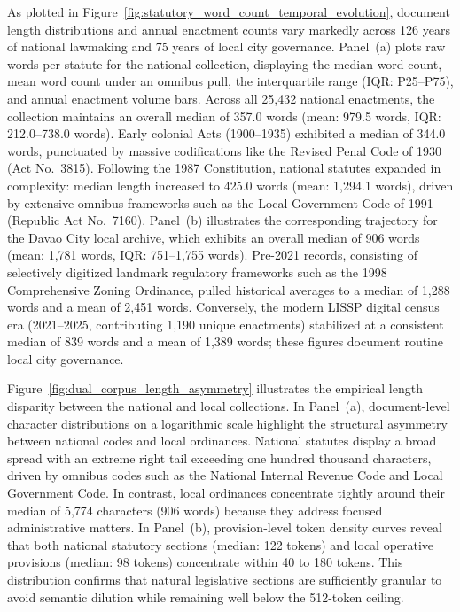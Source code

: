 As plotted in Figure~\ref{fig:statutory_word_count_temporal_evolution}, document length distributions and annual enactment counts vary markedly across 126 years of national lawmaking and 75 years of local city governance. Panel~(a) plots raw words per statute for the national collection, displaying the median word count, mean word count under an omnibus pull, the interquartile range (IQR: P25--P75), and annual enactment volume bars. Across all 25,432 national enactments, the collection maintains an overall median of 357.0 words (mean: 979.5 words, IQR: 212.0--738.0 words). Early colonial Acts (1900--1935) exhibited a median of 344.0 words, punctuated by massive codifications like the Revised Penal Code of 1930 (Act No.~3815). Following the 1987 Constitution, national statutes expanded in complexity: median length increased to 425.0 words (mean: 1,294.1 words), driven by extensive omnibus frameworks such as the Local Government Code of 1991 (Republic Act No.~7160). Panel~(b) illustrates the corresponding trajectory for the Davao City local archive, which exhibits an overall median of 906 words (mean: 1,781 words, IQR: 751--1,755 words). Pre-2021 records, consisting of selectively digitized landmark regulatory frameworks such as the 1998 Comprehensive Zoning Ordinance, pulled historical averages to a median of 1,288 words and a mean of 2,451 words. Conversely, the modern LISSP digital census era (2021--2025, contributing 1,190 unique enactments) stabilized at a consistent median of 839 words and a mean of 1,389 words; these figures document routine local city governance.

Figure~\ref{fig:dual_corpus_length_asymmetry} illustrates the empirical length disparity between the national and local collections. In Panel~(a), document-level character distributions on a logarithmic scale highlight the structural asymmetry between national codes and local ordinances. National statutes display a broad spread with an extreme right tail exceeding one hundred thousand characters, driven by omnibus codes such as the National Internal Revenue Code and Local Government Code. In contrast, local ordinances concentrate tightly around their median of 5,774 characters (906 words) because they address focused administrative matters. In Panel~(b), provision-level token density curves reveal that both national statutory sections (median: 122 tokens) and local operative provisions (median: 98 tokens) concentrate within 40 to 180 tokens. This distribution confirms that natural legislative sections are sufficiently granular to avoid semantic dilution while remaining well below the 512-token ceiling.

